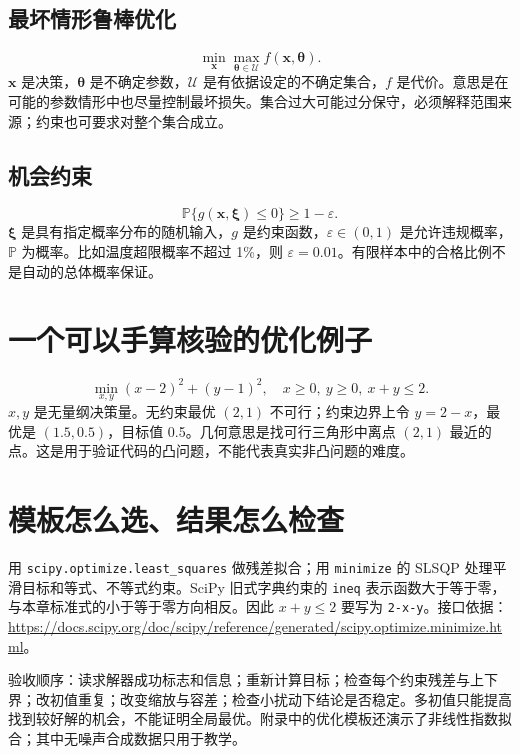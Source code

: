 \subsection{最坏情形鲁棒优化}
\begin{equation}\min_{\boldsymbol x}\max_{\boldsymbol\theta\in\mathcal U} f(\boldsymbol x,\boldsymbol\theta).\end{equation}
$\boldsymbol x$ 是决策，$\boldsymbol\theta$ 是不确定参数，$\mathcal U$ 是有依据设定的不确定集合，$f$ 是代价。意思是在可能的参数情形中也尽量控制最坏损失。集合过大可能过分保守，必须解释范围来源；约束也可要求对整个集合成立。
\subsection{机会约束}
\begin{equation}\mathbb P\{g(\boldsymbol x,\boldsymbol\xi)\le0\}\ge1-\varepsilon.\end{equation}
$\boldsymbol\xi$ 是具有指定概率分布的随机输入，$g$ 是约束函数，$\varepsilon\in(0,1)$ 是允许违规概率，$\mathbb P$ 为概率。比如温度超限概率不超过 1\%，则 $\varepsilon=0.01$。有限样本中的合格比例不是自动的总体概率保证。

\section{一个可以手算核验的优化例子}
\begin{equation}\min_{x,y}(x-2)^2+(y-1)^2,\quad x\ge0,\ y\ge0,\ x+y\le2.\end{equation}
$x,y$ 是无量纲决策量。无约束最优 $(2,1)$ 不可行；约束边界上令 $y=2-x$，最优是 $(1.5,0.5)$，目标值 0.5。几何意思是找可行三角形中离点 $(2,1)$ 最近的点。这是用于验证代码的凸问题，不能代表真实非凸问题的难度。

\section{模板怎么选、结果怎么检查}
用 \texttt{scipy.optimize.least\_squares} 做残差拟合；用 \texttt{minimize} 的 SLSQP 处理平滑目标和等式、不等式约束。SciPy 旧式字典约束的 \texttt{ineq} 表示函数大于等于零，与本章标准式的小于等于零方向相反。因此 $x+y\le2$ 要写为 \texttt{2-x-y}。接口依据：\url{https://docs.scipy.org/doc/scipy/reference/generated/scipy.optimize.minimize.html}。

验收顺序：读求解器成功标志和信息；重新计算目标；检查每个约束残差与上下界；改初值重复；改变缩放与容差；检查小扰动下结论是否稳定。多初值只能提高找到较好解的机会，不能证明全局最优。附录中的优化模板还演示了非线性指数拟合；其中无噪声合成数据只用于教学。
